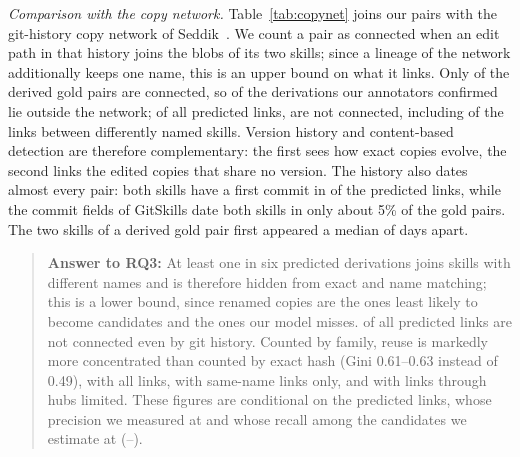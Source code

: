 \documentclass[sigconf,screen]{acmart}
\begin{document}
\emph{Comparison with the copy network.} Table~\ref{tab:copynet} joins our pairs with the git-history copy network of Seddik~\cite{seddik2026constellations}. We count a pair as connected when an edit path in that history joins the blobs of its two skills; since a lineage of the network additionally keeps one name, this is an upper bound on what it links. Only \ResCNGoldDerivedConnected{} of the \ResCNGoldDerived{} derived gold pairs are connected, so \ResCNGoldDerivedMissedPct{} of the derivations our annotators confirmed lie outside the network; of all \ResCNAllLinks{} predicted links, \ResCNAllMissedPct{} are not connected, including \ResCNDiffNameMissedPct{} of the links between differently named skills. Version history and content-based detection are therefore complementary: the first sees how exact copies evolve, the second links the edited copies that share no version. The history also dates almost every pair: both skills have a first commit in \ResCNAllDatedPct{} of the predicted links, while the commit fields of GitSkills date both skills in only about 5\% of the gold pairs. The two skills of a derived gold pair first appeared a median of \ResCNGoldMedianGapDays{} days apart.
 
\begin{table}[t]
\caption{Pairs connected by an edit path in the git-history copy network (an upper bound on its lineages).}
\label{tab:copynet}
\small
{}
\end{table}

\begin{quote}
\textbf{Answer to RQ3:} At least one in six predicted derivations joins skills with different names and is therefore hidden from exact and name matching; this is a lower bound, since renamed copies are the ones least likely to become candidates and the ones our model misses. \ResCNAllMissedPct{} of all predicted links are not connected even by git history. Counted by family, reuse is markedly more concentrated than counted by exact hash (Gini 0.61--0.63 instead of 0.49), with all links, with same-name links only, and with links through hubs limited. These figures are conditional on the predicted links, whose precision we measured at \ResValPrecision{} and whose recall among the candidates we estimate at \ResRCRecall{} (\ResRCRecallLo--\ResRCRecallHi).
\end{quote}
\end{document}
